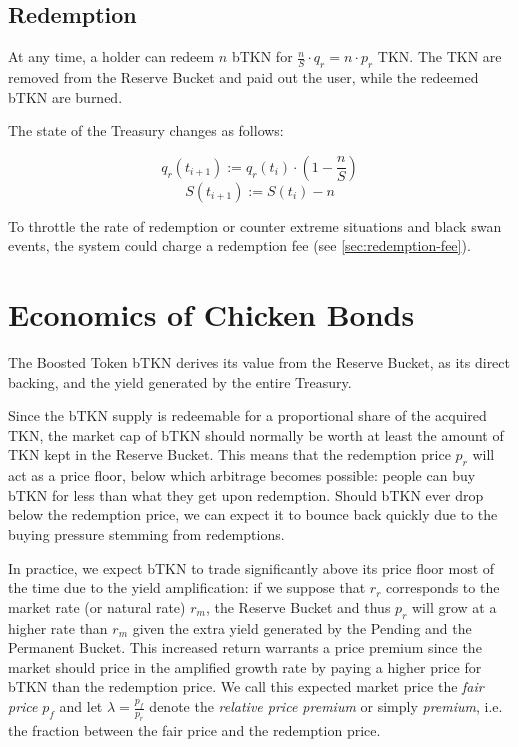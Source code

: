 \documentclass{article}
\begin{document}
\subsection{Redemption}
\label{sec:redemption}
At any time, a holder can redeem $n$ bTKN for $\frac{n}{S}\cdot q_r = n \cdot p_r$ TKN.
The TKN are removed from the Reserve Bucket and paid out the user, while the redeemed bTKN are burned.

The state of the Treasury changes as follows: 

\begin{equation}
  \label{eq:redemption-qa}
    q_r(t_{i+1}) := q_r(t_i) \cdot (1 - \frac{n}{S})
\end{equation}
\begin{equation}
  \label{eq:redemption-S}
    S(t_{i+1}) := S(t_i) - n
\end{equation}

To throttle the rate of redemption or counter extreme situations and black swan events, the system could charge a redemption fee (see \ref{sec:redemption-fee}).

\section{Economics of Chicken Bonds}
 \label{sec:economics}
The Boosted Token bTKN derives its value from the Reserve Bucket, as its direct backing, and the yield generated by the entire Treasury.

Since the bTKN supply is redeemable for a proportional share of the acquired TKN, the market cap of bTKN should normally be worth at least the amount of TKN kept in the Reserve Bucket. This means that the redemption price $p_r$ will act as a price floor, below which arbitrage becomes possible: people can buy bTKN for less than what they get upon redemption. Should bTKN ever drop below the redemption price, we can expect it to bounce back quickly due to the buying pressure stemming from redemptions.

In practice, we expect bTKN to trade significantly above its price floor most of the time due to the yield amplification: if we suppose that $r_r$ corresponds to the market rate (or natural rate) $r_m$, the Reserve Bucket and thus $p_r$ will grow at a higher rate than $r_m$ given the extra yield generated by the Pending and the Permanent Bucket. This increased return warrants a price premium since the market should price in the amplified growth rate by paying a higher price for bTKN than the redemption price. We call this expected market price the \textit{fair price} $p_f$ and let $\lambda = \frac{p_f}{p_r}$ denote the \textit{relative price premium} or simply \textit{premium}, i.e. the fraction between the fair price and the redemption price.
\end{document}
